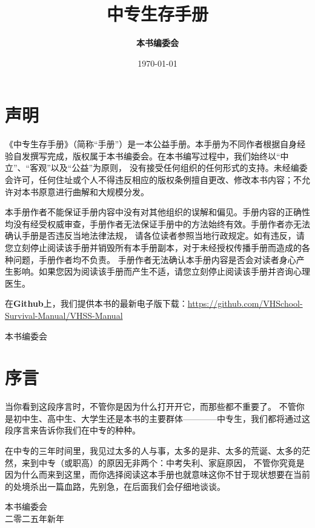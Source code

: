 \documentclass{article}
\begin{document}
\title{\textbf{中专生存手册}}
\author{\textbf{本书编委会}}
\date{\today{}}

\maketitle
\thispagestyle{empty}
\newpage

\section{声明}

《中专生存手册》（简称“手册”）是一本公益手册。本手册为不同作者根据自身经验自发撰写完成，版权属于本书编委会。在本书编写过程中，我们始终以“中立”、“客观”以及“公益”为原则，
没有接受任何组织的任何形式的支持。未经编委会许可，任何住址或个人不得违反相应的版权条例擅自更改、修改本书内容；不允许对本书原意进行曲解和大规模分发。

本手册作者不能保证手册内容中没有对其他组织的误解和偏见。手册内容的正确性均没有经受权威审查，手册作者无法保证手册中的方法始终有效。手册作者亦无法确认手册是否违反当地法律法规，
请各位读者参照当地行政规定。如有违反，请您立刻停止阅读该手册并销毁所有本手册副本，对于未经授权传播手册而造成的各种问题，手册作者均不负责。
手册作者无法确认本手册内容是否会对读者身心产生影响。如果您因为阅读该手册而产生不适，请您立刻停止阅读该手册并咨询心理医生。

在\textbf{Github}上，我们提供本书的最新电子版下载：\href{VHSS-Manual}{https://github.com/VHSchool-Survival-Manual/VHSS-Manual}

\begin{flushright}
本书编委会
\end{flushright}
\newpage

\section{序言}

当你看到这段序言时，不管你是因为什么打开开它，而那些都不重要了。
不管你是初中生、高中生、大学生还是本书的主要群体————中专生，我们都将通过这段序言来告诉你我们在中专的种种。

在中专的三年时间里，我见过太多的人与事，太多的是非、太多的荒诞、太多的茫然，来到中专（或职高）的原因无非两个：中考失利、家庭原因，
不管你究竟是因为什么而来到这里，而你选择阅读这本手册也就意味这你不甘于现状想要在当前的处境杀出一篇血路，先别急，在后面我们会仔细地谈谈。

\begin{flushright}
本书编委会 \\ 二零二五年新年
\end{flushright}

\newpage
\tableofcontents



\end{document}
